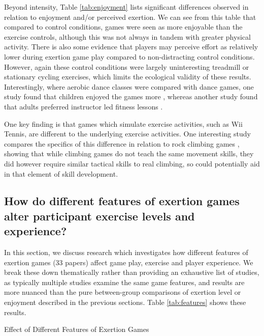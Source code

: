 Beyond intensity, Table \ref{tab:enjoyment} lists significant differences observed in relation to enjoyment and/or perceived exertion. We can see from this table that compared to control conditions, games were seen as more enjoyable than the exercise controls, although this was not always in tandem with greater physical activity. There is also some evidence \cite{Haddock_2009,Monedero2015InteractiveAdults,Devereaux2012ComparisonExercise} that players may perceive effort as relatively lower during exertion game play compared to non-distracting control conditions. However, again these control conditions were largely uninteresting treadmill or stationary cycling exercises, which limits the ecological validity of these results. Interestingly, where aerobic dance classes were compared with dance games, one study found that children enjoyed the games more \cite{Gao2013ChildrenSDance}, whereas another study found that adults preferred instructor led fitness lessons \cite{eason2016comparison}. 

One key finding is that games which simulate exercise activities, such as Wii Tennis, are different to the underlying exercise activities. One interesting study compares the specifics of this difference in relation to rock climbing games \cite{Jenny2015VirtualPerceptions}, showing that while climbing games do not teach the same movement skills, they did however require similar tactical skills to real climbing, so could potentially aid in that element of skill development.

\subsection{How do different features of exertion games alter participant exercise levels and experience?}

In this section, we discuss research which investigates how different features of exertion games (33 papers) affect game play, exercise and player experience. We break these down thematically rather than providing an exhaustive list of studies, as typically multiple studies examine the same game features, and results are more nuanced than the pure between-group comparisons of exertion level or enjoyment described in the previous sections. Table \ref{tab:features} shows these results.

\begin{table}
\caption{Effect of Different Features of Exertion Games}
\label{tab:features}
\centering

\end{table}

